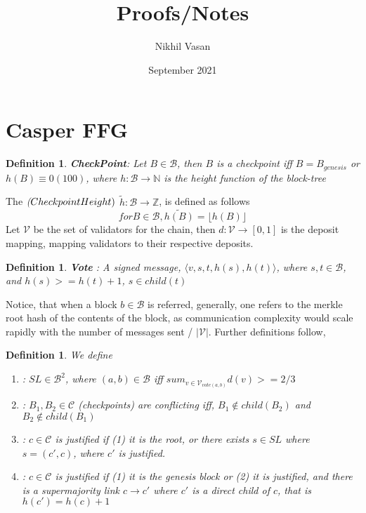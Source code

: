 \documentclass{amsart}
\title{Proofs/Notes}
\author{Nikhil Vasan }
\date{September 2021}
\numberwithin{equation}{section}
\theoremstyle{plain}
\newtheorem{dfn}[thm]{Definition}
\theoremstyle{definition}
\begin{document}
\maketitle
\section{Casper FFG}
\begin{dfn}
\textbf{CheckPoint}: Let $B \in \mathcal{B}$, then $B$ is a checkpoint iff $B = B_{genesis}$ or $h(B) \equiv 0 (100)$, where $h: \mathcal{B} \rightarrow \mathbb{N}$ is the height function of the block-tree
\end{dfn}
The $\textit(Checkpoint Height)$ $\tilde{h} : \mathcal{B} \rightarrow \mathbb{Z}$, is defined as follows 
\begin{equation} 
  for B \in \mathcal{B}, \tilde{h(B)} = \lfloor h(B) \rfloor
\end{equation}
Let $\mathcal{V}$ be the set of validators for the chain, then $d: \mathcal{V} \rightarrow [0,1]$ is the deposit mapping, mapping validators to their respective deposits.
\begin{dfn}
  \textbf{Vote} : A signed message, $\langle v, s,t, h(s), h(t) \rangle$, where $s,t \in \mathcal{B}$, and $h(s) >= h(t) + 1 $, $s \in child(t)$
\end{dfn}
Notice, that when a block $b \in \mathcal{B}$ is referred, generally, one refers to the merkle root hash of the contents of the block, as communication complexity would scale rapidly with the number of messages sent / $|\mathcal{V}|$. Further definitions follow, 
\begin{dfn}
  We define
  \begin{enumerate}
 \item[\textit{supermajority link}]: $SL \in \mathcal{B}^2$, where $(a,b) \in \mathcal{B}$ iff $sum_{v \in \mathcal{V}_{vote(a,b)}}  d(v) >= 2/3$ \\ 
 \item[\textit{conflicting}]: $B_1, B_2 \in \mathcal{C}$ (checkpoints) are conflicting iff, $B_1 \not \in child(B_2)$ and $B_2 \not \in child(B_1)$
 \item[\textit{justified}]: $c \in \mathcal{C}$ is justified if (1) it is the root, or there exists $s \in SL$ where $s = (c',c)$, where $c'$ is justified.
 \item[\textit{finalized}]: $c \in \mathcal{C}$ is justified if (1) it is the genesis block or (2) it is justified, and there is a \textit{supermajority link} $c \rightarrow c'$ where $c'$ is a \textit{direct child} of $c$, that is $h(c') = h(c) + 1$
  \end{enumerate}
\end{dfn}
\end{document}
